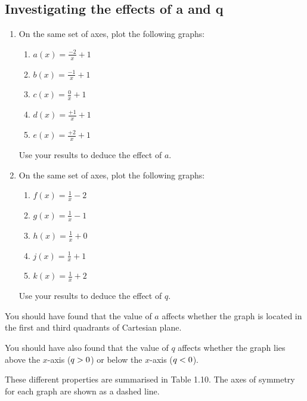             \subsection{  Investigating the effects of a and q }
            \nopagebreak
        \label{m39341*id246236}\begin{enumerate}[noitemsep, label=\textbf{\arabic*}. ] 
            \label{m39341*uid139}\item On the same set of axes, plot the following graphs:
\label{m39341*id246252}\begin{enumerate}[noitemsep, label=\textbf{\alph*}. ] 
            \label{m39341*uid140}\item $a\left(x\right)=\frac{-2}{x}+1$\label{m39341*uid141}\item $b\left(x\right)=\frac{-1}{x}+1$\label{m39341*uid142}\item $c\left(x\right)=\frac{0}{x}+1$\label{m39341*uid143}\item $d\left(x\right)=\frac{+1}{x}+1$\label{m39341*uid144}\item $e\left(x\right)=\frac{+2}{x}+1$\end{enumerate}
Use your results to deduce the effect of $a$.
\label{m39341*uid145}\item On the same set of axes, plot the following graphs:
\label{m39341*id246494}\begin{enumerate}[noitemsep, label=\textbf{\alph*}. ] 
            \label{m39341*uid146}\item $f\left(x\right)=\frac{1}{x}-2$\label{m39341*uid147}\item $g\left(x\right)=\frac{1}{x}-1$\label{m39341*uid148}\item $h\left(x\right)=\frac{1}{x}+0$\label{m39341*uid149}\item $j\left(x\right)=\frac{1}{x}+1$\label{m39341*uid150}\item $k\left(x\right)=\frac{1}{x}+2$\end{enumerate}
Use your results to deduce the effect of $q$.
\end{enumerate}
        \label{m39341*id246723}You should have found that the value of $a$ affects whether the graph is located in the first and third quadrants of Cartesian plane.\par 
        \label{m39341*id246740}You should have also found that the value of $q$ affects whether the graph lies above the $x$-axis ($q>{}0$) or below the $x$-axis ($q<{}0$).\par 
        \label{m39341*id246801}These different properties are summarised in Table 1.10. The axes of symmetry for each graph are shown as a dashed line.\par 
